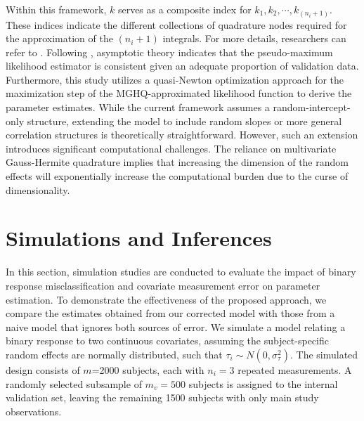 \documentclass[twoside]{article}
\begin{document}
Within this framework, $k$ serves as a composite index for $k_1,k_2,\cdots,k_{(n_i+1)}$. These indices indicate the different collections of quadrature nodes required for the approximation of the $(n_i+1)$ integrals. For more details, researchers can refer to \cite{Ahangari:2023}. Following \cite{CR6}, asymptotic theory indicates that the pseudo-maximum likelihood estimator is consistent given an adequate proportion of validation data. Furthermore, this study utilizes a quasi-Newton optimization approach for the maximization step of the MGHQ-approximated likelihood function to derive the parameter estimates.
While the current framework assumes a random-intercept-only structure, extending the model to include random slopes or more general correlation structures is theoretically straightforward. However, such an extension introduces significant computational challenges. The reliance on multivariate Gauss-Hermite quadrature implies that increasing the dimension of the random effects will exponentially increase the computational burden due to the curse of dimensionality.
\section{Simulations and Inferences}
In this section, simulation studies are conducted to evaluate the impact of binary response misclassification and covariate measurement error on parameter estimation. To demonstrate the effectiveness of the proposed approach, we compare the estimates obtained from our corrected model with those from a naive model that ignores both sources of error. 
We simulate a model relating a binary response to two continuous covariates, assuming the subject-specific random effects are normally distributed, such that $\tau _i \sim N(0,\sigma _{\tau}^2 )$. The simulated design consists of $m$=2000 subjects, each with $n_i=3$ repeated measurements. A randomly selected subsample of $m_v=500$ subjects is assigned to the internal validation set, leaving the remaining 1500 subjects with only main study observations.
\end{document}
